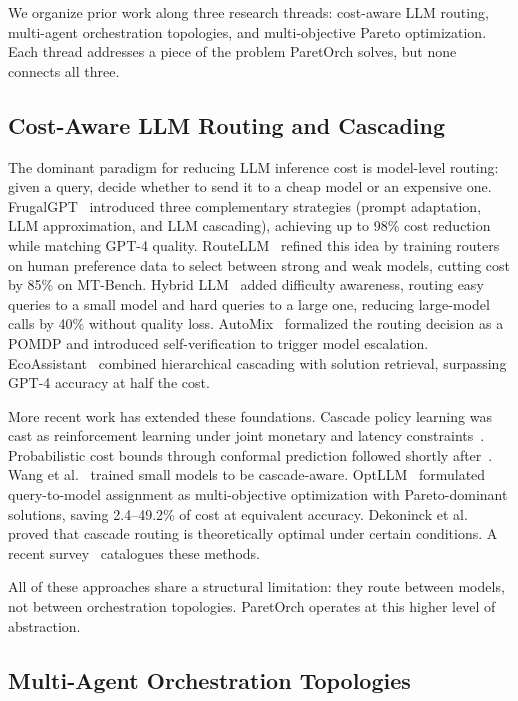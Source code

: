 \documentclass{article}
\begin{document}
We organize prior work along three research threads: cost-aware LLM routing, multi-agent orchestration topologies, and multi-objective Pareto optimization. Each thread addresses a piece of the problem ParetOrch solves, but none connects all three.

\subsection{Cost-Aware LLM Routing and Cascading}

The dominant paradigm for reducing LLM inference cost is model-level routing: given a query, decide whether to send it to a cheap model or an expensive one. FrugalGPT~\cite{chen2023frugalgpt} introduced three complementary strategies (prompt adaptation, LLM approximation, and LLM cascading), achieving up to 98\% cost reduction while matching GPT-4 quality. RouteLLM~\cite{ong2024routellm} refined this idea by training routers on human preference data to select between strong and weak models, cutting cost by 85\% on MT-Bench. Hybrid LLM~\cite{ding2024hybrid} added difficulty awareness, routing easy queries to a small model and hard queries to a large one, reducing large-model calls by 40\% without quality loss. AutoMix~\cite{aggarwal2024automix} formalized the routing decision as a POMDP and introduced self-verification to trigger model escalation. EcoAssistant~\cite{zhang2023ecoassistant} combined hierarchical cascading with solution retrieval, surpassing GPT-4 accuracy at half the cost.

More recent work has extended these foundations. Cascade policy learning was cast as reinforcement learning under joint monetary and latency constraints~\cite{treacle2024}. Probabilistic cost bounds through conformal prediction followed shortly after~\cite{c3po2025}. Wang et al.~\cite{wang2024cascade_aware} trained small models to be cascade-aware. OptLLM~\cite{liu2024optllm} formulated query-to-model assignment as multi-objective optimization with Pareto-dominant solutions, saving 2.4--49.2\% of cost at equivalent accuracy. Dekoninck et al.~\cite{dekoninck2024unified} proved that cascade routing is theoretically optimal under certain conditions. A recent survey~\cite{dynamic_routing_survey2026} catalogues these methods.

All of these approaches share a structural limitation: they route between models, not between orchestration topologies. ParetOrch operates at this higher level of abstraction.

\subsection{Multi-Agent Orchestration Topologies}
\end{document}
